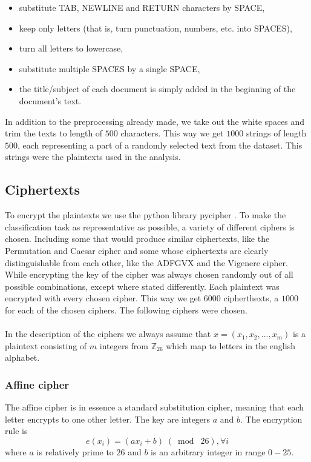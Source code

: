\documentclass[a4paper]{article}
\begin{document}
\begin{itemize}	
	\setlength\itemsep{-0.2em}
    \item substitute TAB, NEWLINE and RETURN characters by SPACE,
    \item keep only letters (that is, turn punctuation, numbers, etc. into SPACES),
    \item turn all letters to lowercase,
    \item substitute multiple SPACES by a single SPACE,
    \item the title/subject of each document is simply added in the beginning of the document's text.
\end{itemize}


In addition to the preprocessing already made, we take out the white spaces and trim the texts to length of $500$ characters. This way we get $1000$ strings of length $500$, each representing a part of a randomly selected text from the dataset. This strings were the plaintexts used in the analysis.

\subsection{Ciphertexts}
To encrypt the plaintexts we use the python library pycipher \cite{pycipher}. To make the classification task as representative as possible, a variety of different ciphers is chosen. Including some that would produce similar ciphertexts, like the Permutation and Caesar cipher and some whose ciphertexts are clearly distinguishable from each other, like the ADFGVX and the Vigenere cipher. While encrypting the key of the cipher was always chosen randomly out of all possible combinations, except where stated differently. Each plaintext was encrypted with every chosen cipher. This way we get $6000$ cipherthexts, a $1000$ for each of the chosen ciphers. The following ciphers were chosen.\\
\\
In the description of the ciphers we always assume that $x = (x_{1}, x_{2}, ...,x_{m})$ is a plaintext consisting of $m$ integers from $\mathbb{Z}_{26}$ which map to letters in the english alphabet.

\subsubsection{Affine cipher}
The affine cipher is in essence a standard substitution cipher, meaning that each letter encrypts to one other letter. The key are integers $a$ and $b$. The encryption rule is
$$e(x_{i}) = (ax_{i} + b) \;(\bmod\; 26), \forall i$$
where $a$ is relatively prime to $26$ and $b$ is an arbitrary integer in range $0-25$.
\end{document}
